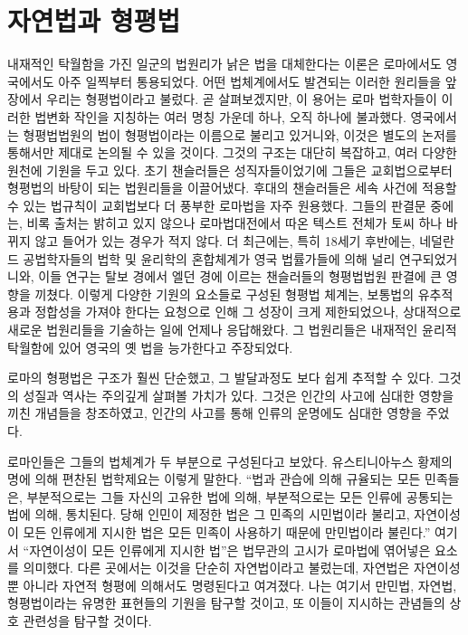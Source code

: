 \chapter{자연법과 형평법}

내재적인 탁월함을 가진
일군의 법원리가
낡은 법을 대체한다는 이론은
로마에서도 영국에서도 아주 일찍부터 통용되었다.
어떤 법체계에서도 발견되는
이러한 원리들을 앞 장에서 우리는 형평법이라고 불렀다.
곧 살펴보겠지만, 이 용어는
로마 법학자들이 이러한 법변화 작인을 지칭하는
여러 명칭 가운데 하나, 오직 하나에 불과했다.
영국에서는 형평법법원의 법이
형평법이라는 이름으로 불리고 있거니와,
이것은 별도의 논저를 통해서만 제대로 논의될 수 있을 것이다.
그것의 구조는 대단히 복잡하고, 여러 다양한 원천에 기원을 두고 있다.
초기 챈슬러들은 성직자들이었기에 그들은 교회법으로부터
형평법의 바탕이 되는 법원리들을 이끌어냈다.
후대의 챈슬러들은
세속 사건에 적용할 수 있는 법규칙이 교회법보다 더 풍부한 로마법을
자주 원용했다.
그들의 판결문 중에는, 비록 출처는 밝히고 있지 않으나
로마법대전에서 따온 텍스트 전체가 토씨 하나 바뀌지 않고
들어가 있는 경우가 적지 않다.
더 최근에는, 특히 18세기 후반에는,
네덜란드 공법학자들의 법학 및 윤리학의 혼합체계가 영국 법률가들에 의해
널리 연구되었거니와,
이들 연구는
탈보 경에서 엘던 경에 이르는
챈슬러들의 형평법법원 판결에 큰 영향을 끼쳤다.
이렇게 다양한 기원의 요소들로 구성된 형평법 체계는,
보통법의 유추적용과 정합성을 가져야 한다는 요청으로 인해
그 성장이 크게 제한되었으나,
상대적으로 새로운 법원리들을 기술하는 일에 언제나 응답해왔다.
그 법원리들은 내재적인 윤리적 탁월함에 있어 영국의 옛 법을 능가한다고
주장되었다.

로마의 형평법은 구조가 훨씬 단순했고, 그 발달과정도 보다 쉽게 추적할 수 있다.
그것의 성질과 역사는 주의깊게 살펴볼 가치가 있다.
그것은 인간의 사고에 심대한 영향을 끼친 개념들을 창조하였고,
인간의 사고를 통해 인류의 운명에도 심대한 영향을 주었다.

로마인들은 그들의 법체계가 두 부분으로 구성된다고 보았다.
유스티니아누스 황제의 명에 의해 편찬된 법학제요는 이렇게 말한다.
``법과 관습에 의해 규율되는 모든 민족들은, 부분적으로는 그들 자신의
고유한 법에 의해, 부분적으로는 모든 인류에 공통되는 법에 의해,
통치된다. 당해 인민이 제정한 법은 그 민족의 시민법이라
불리고, 자연이성이 모든 인류에게 지시한 법은
모든 민족이 사용하기 때문에
만민법이라 불린다.''
여기서 ``자연이성이 모든 인류에게 지시한 법''은 법무관의 고시가
로마법에 엮어넣은 요소를 의미했다.
다른 곳에서는 이것을 단순히 자연법이라고 불렀는데,
자연법은 자연이성뿐 아니라 자연적 형평에 의해서도
명령된다고 여겨졌다.
나는 여기서 만민법, 자연법, 형평법이라는 유명한 표현들의 기원을 탐구할 것이고,
또 이들이 지시하는 관념들의 상호 관련성을 탐구할 것이다.

